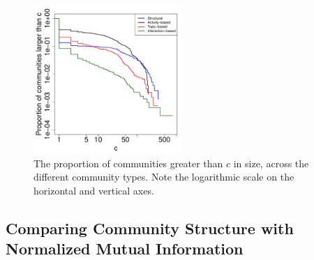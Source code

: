 \begin{figure}[ht]
  \centering
\includegraphics[width=0.50\textwidth]{Figures/comm_sizes_ecdf_loglog.pdf}
\caption{The proportion of communities greater than $c$ in size, across the different community types. Note the logarithmic scale on the horizontal and vertical axes.}
\label{Fig-community_size_distribution}
\end{figure}




\subsection{Comparing Community Structure with Normalized Mutual Information}

